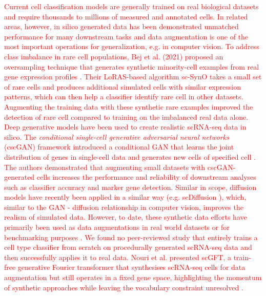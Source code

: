 \documentclass{article}
\newcommand{\gpt}[1]{\textcolor{red}{#1}}
\begin{document}
\gpt{Current cell classification models are generally trained on real biological datasets and require thousands to millions of measured and annotated cells. In related areas, however, in silico generated data has been demonstrated unmatched performance for many downstream tasks \cite{wood20223d, flotho2024t} and data augmentation is one of the most important operations for generalization, e.g. in computer vision. To address class imbalance in rare cell populations, Bej et al. (2021) proposed an oversampling technique that generates synthetic minority-cell examples from real gene expression profiles \cite{bej2021automated}. Their LoRAS-based algorithm sc-SynO takes a small set of rare cells and produces additional simulated cells with similar expression patterns, which can then help a classifier identify rare cell   in other datasets. Augmenting the training data with these synthetic rare examples improved the detection of rare cell   compared to training on the imbalanced real data alone. Deep generative models have been used to create realistic scRNA-seq data in silico. The \textit{conditional single-cell generative adversarial neural networks} (cscGAN) framework introduced a conditional GAN that learns the joint distribution of genes in single-cell data and generates new cells of specified cell   \cite{marouf2020realistic}. The authors demonstrated that augmenting small datasets with cscGAN-generated cells increases the performance and reliability of downstream analyses such as classifier accuracy and marker gene detection. Similar in scope, diffusion models have recently been applied in a similar way (e.g. scDiffusion \cite{luo2024scdiffusion}), which, similar to the GAN - diffusion relationship in computer vision, improves the realism of simulated data. However, to date, these synthetic data efforts have primarily been used as data augmentations in real world datasets or for benchmarking purposes \cite{treppner2021synthetic}. We found no peer-reviewed study that entirely trains a cell type classifier from scratch on procedurally generated scRNA-seq data and then successfully applies it to real data. 
Nouri et al. presented scGFT, a train-free generative Fourier transformer that synthesises scRNA-seq cells for data augmentation but still operates in a fixed gene space, highlighting the momentum of synthetic approaches while leaving the vocabulary constraint unresolved \cite{nouri2025single}.}
\end{document}
